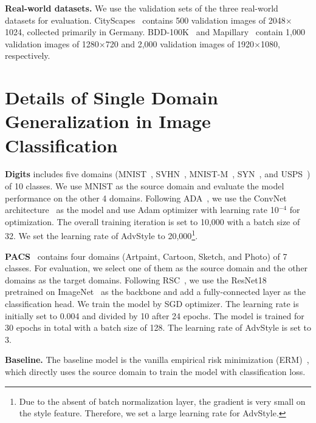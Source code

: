 \documentclass{article}
\newcommand{\ours}{AdvStyle\xspace}
\begin{document}
\textbf{Real-world datasets.}
We use the validation sets of the three real-world datasets for evaluation. CityScapes~\cite{CityScapes} contains 500 validation images of 2048$\times$1024, collected primarily in Germany. BDD-100K~\cite{bdd} and Mapillary~\cite{mapillary} contain 1,000 validation images of 1280$\times$720  and 2,000  validation images of 1920$\times$1080, respectively.

\section{Details of Single Domain Generalization in Image Classification}
\label{sec:details-of-single}

\textbf{Digits} includes five domains (MNIST~\cite{mnist}, SVHN~\cite{svhn}, MNIST-M~\cite{mnist-m-syn}, SYN~\cite{mnist-m-syn}, and USPS~\cite{USPS}) of 10 classes. We use MNIST as the source domain and evaluate the model performance on the other 4 domains. Following ADA~\cite{volpi2018generalizing}, we use the ConvNet architecture~\cite{mnist} as the model and use Adam optimizer with learning rate 10$^{-4}$ for optimization. The overall training iteration is set to 10,000 with a batch size of 32. We set the learning rate of \ours to 20,000\footnote{Due to the absent of batch normalization layer, the gradient is very small on the style feature. Therefore, we set a large learning rate for \ours.}. 

\textbf{PACS}~\cite{pacs} contains four domains (Artpaint, Cartoon, Sketch, and Photo) of 7 classes. For evaluation, we select one of them as the source domain and the other domains as the target domains. Following RSC~\cite{huangRSC2020}, we use the ResNet18~\cite{he2016deep} pretrained on ImageNet~\cite{imagenet} as the backbone and add a fully-connected layer as the classification head. We train the model by SGD optimizer. The learning rate is initially set to 0.004 and divided by 10 after 24 epochs. The model is trained for 30 epochs in total with a batch size of 128. The learning rate of \ours is set to 3.

\textbf{Baseline.} The baseline model is the vanilla empirical risk minimization (ERM)~\cite{vapnik2013nature}, which directly uses the source domain to train the model with classification loss.
\end{document}
